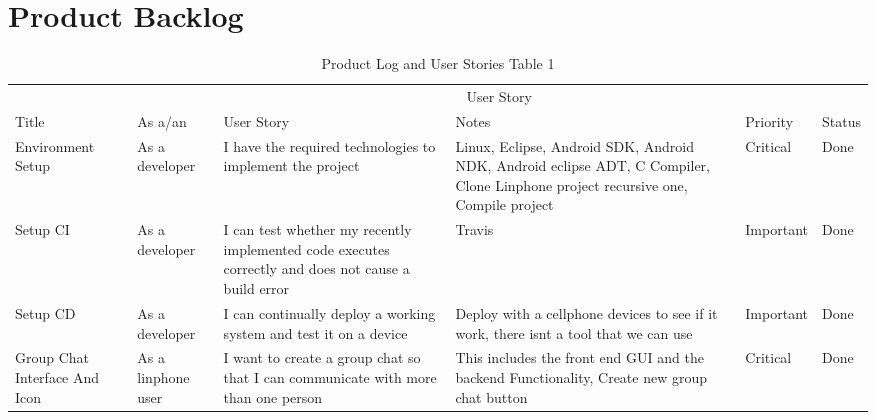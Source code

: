 \documentclass[a4paper]{article}
\begin{document}
\section{Product Backlog}
\begin{table} 
\begin{tabular}{p{1.5cm} p{2.5cm} p{3cm} p{3cm} p{1cm} p{1cm}} %
\hline %
& \multicolumn{5}{c}{User Story} \\ %
\cmidrule(l){2-6} %
Title & As a/an & User Story & Notes & Priority & Status\\ %
\hline %
Environment Setup & As a developer & I have the required technologies to implement the project & Linux, Eclipse, Android SDK, Android NDK, Android eclipse ADT, C Compiler, Clone Linphone project recursive one, Compile project  & Critical & Done\\ \cmidrule(l){2-6} %
Setup CI & As a developer & I can test whether my recently implemented code executes correctly and does not cause a build error & Travis & Important & Done\\ \cmidrule(l){2-6}%

Setup CD & As a developer & I can continually deploy a working system and test it on a device & Deploy with a cellphone devices to see if it work, there isnt a tool that we can use & Important & Done\\ \cmidrule(l){2-6} %

Group Chat Interface And Icon & As a linphone user & I want to create a group chat so that I can communicate with more than one person  & This includes the front end GUI and the backend Functionality, Create new group chat button & Critical & Done\\ %

\midrule %
\midrule %
\end{tabular}
\caption{Product Log and User Stories Table 1} %
\label{tab:template} %
\end{table}
\end{document}
